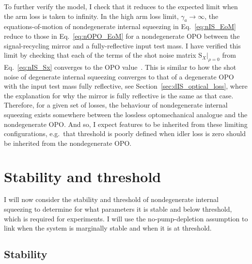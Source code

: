 To further verify the model, I check that it reduces to the expected limit when the arm loss is taken to infinity. 
In the high arm loss limit, $\gamma_a\rightarrow\infty$, the equations-of-motion of nondegenerate internal squeezing in Eq.~\ref{eq:nIS_EoM} reduce to those in Eq.~\ref{eq:nOPO_EoM} for a nondegenerate OPO between the signal-recycling mirror and a fully-reflective input test mass.
I have verified this limit by checking that each of the terms of the shot noise matrix $\text{S}_X|_{\rho=0}$ from Eq.~\ref{eq:nIS_Sx} converges to the OPO value~\cite{}. 
This is similar to how the shot noise of degenerate internal squeezing converges to that of a degenerate OPO with the input test mass fully reflective, see Section~\ref{sec:dIS_optical_loss}, where the explanation for why the mirror is fully reflective is the same as that case. 
Therefore, for a given set of losses, the behaviour of nondegenerate internal squeezing exists somewhere between the lossless optomechanical analogue and the nondegenerate OPO. And so, I expect features to be inherited from these limiting configurations, e.g.\ that threshold is poorly defined when idler loss is zero should be inherited from the nondegenerate OPO.


\section{Stability and threshold}

I will now consider the stability and threshold of nondegenerate internal squeezing to determine for what parameters it is stable and below threshold, which is required for experiments. I will use the no-pump-depletion assumption to link when the system is marginally stable and when it is at threshold.

\subsection{Stability}
\label{sec:nIS_stability}

